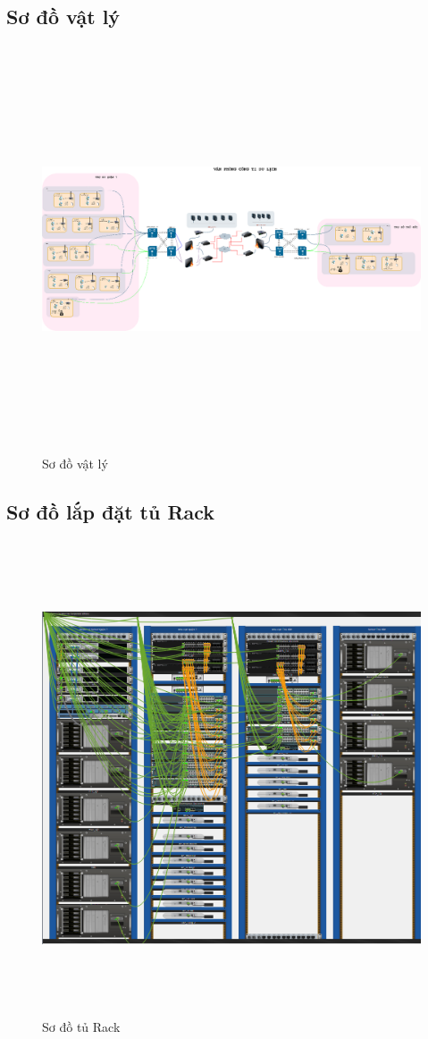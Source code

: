 \documentclass[a4paper, 12pt]{article}
\begin{document}
\subsection{Sơ đồ vật lý}
\begin{figure}[H]
    \centering
    \includegraphics[width=16cm, height=12cm]{img/physical.drawio.png}
    \caption{Sơ đồ vật lý}
    \label{hinh22 }
\end{figure}
\subsection{Sơ đồ lắp đặt tủ Rack}
\begin{figure}[H]
    \centering
    \includegraphics[width=16cm, height=14cm]{img/rack.png}
    \caption{Sơ đồ tủ Rack}
    \label{hinh23}
\end{figure}
\end{document}
